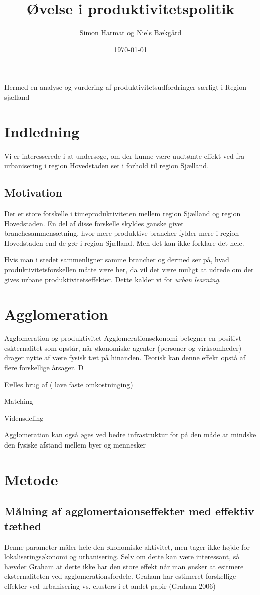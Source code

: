 \documentclass[a4paper, 12pt]{article}
\author{Simon Harmat og Niels Bækgård}
\title{Øvelse i produktivitetspolitik}
\date{\today}
\begin{document}
Hermed en analyse og vurdering af produktivitetsudfordringer særligt i Region sjælland

\section{Indledning}
Vi er interesserede i at undersøge, om der kunne være uudtømte effekt ved fra urbanisering i region Hovedstaden set i forhold til region Sjælland. 
\subsection{Motivation}
Der er store forskelle i timeproduktiviteten mellem region Sjælland og region Hovedstaden. En del af disse forskelle skyldes ganske givet branchesammensætning, hvor mere produktive brancher fylder mere i region Hovedstaden end de gør i region Sjælland. Men det kan ikke forklare det hele.

Hvis man i stedet sammenligner samme brancher og dermed ser på, hvad produktivitetsforskellen måtte være her, da vil det være muligt at udrede om der gives urbane produktivitetseffekter. Dette kalder vi for \emph{urban learning}.
\section{Agglomeration}

Agglomeration og produktivitet
Agglomerationsøkonomi betegner en positivt eskternalitet som opstår, når økonomiske agenter (personer og virksomheder) drager nytte af være fysisk tæt på hinanden. Teorisk kan denne effekt opstå af flere forskellige årsager. D

Fælles brug af ( lave faste omkostninging) 

Matching


Vidensdeling 

Agglomeration kan også øges ved bedre infrastruktur for på den måde at mindske den fysiske afstand mellem byer og mennesker

\section{Metode}
\subsection{Målning af agglomertaionseffekter med effektiv tæthed }

Denne parameter måler hele den økonomiske aktivitet, men tager ikke højde for lokaliseringsøkonomi og urbanisering. Selv om dette kan være interessant, så hævder Graham at dette ikke har den store effekt når man ønsker at esitmere eksternaliteten ved agglomerationsfordele.
Graham har estimeret forskellige effekter ved urbanisering vs. clusters i et andet papir (Graham 2006) 
\end{document}
